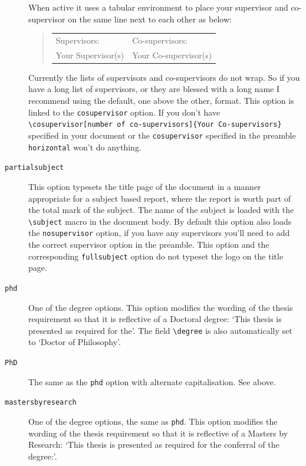 \documentclass[12pt,oneside]{article}
\newcommand{\option}[1]{\texttt{\color{UOWblue}#1}}
\newcommand{\command}[1]{\texttt{\color{UOWred}#1}}
\newcommand{\comoptions}[1]{\texttt{\color{UOWdarkblue}#1}}
\begin{document}
\begin{description}
    When active it uses a tabular environment to place your supervisor and co-supervisor on the same line next to each other as below:

    \begin{quote}
    \begin{raggedright}
    \begin{tabular}{@{}ll@{}} 
        Supervisors: & Co-supervisors:\\
        Your Supervisor(s) & Your Co-supervisor(s)\\
    \end{tabular}
    \end{raggedright}
    \end{quote}
    
    Currently the lists of supervisors and co-supervisors do not wrap. So if you have a long list of supervisors, or they are blessed with a long name I recommend using the default, one above the other, format. This option is linked to the \option{cosupervisor} option. If you don't have \command{\textbackslash{}cosupervisor}\option{[number of co-supervisors]}\comoptions{\{Your Co-supervisors\}} specified in your document or the \option{cosupervisor} specified in the preamble \option{horizontal} won't do anything.
    
    \item[\option{partialsubject}]
    This option typesets the title page of the document in a manner appropriate for a subject based report, where the report is worth part of the total mark of the subject. The name of the subject is loaded with the \command{\textbackslash{}subject} macro in the document body. By default this option also loads the \option{nosupervisor} option, if you have any supervisors you'll need to add the correct supervisor option in the preamble. This option and the corresponding \option{fullsubject} option do not typeset the logo on the title page.
    
    \item[\option{phd}]
    One of the degree options. This option modifies the wording of the thesis requirement so that it is reflective of a Doctoral degree: `This thesis is presented as required for the'. The field \command{\textbackslash{}degree} is also automatically set to `Doctor of Philosophy'.

    \item[\option{PhD}]
    The same as the \option{phd} option with alternate capitalisation. See above.
        
    \item[\option{mastersbyresearch}]
    One of the degree options, the same as \option{phd}. This option modifies the wording of the thesis requirement so that it is reflective of a Masters by Research: `This thesis is presented as required for the conferral of the degree:'.
    

\end{description}
\end{document}
